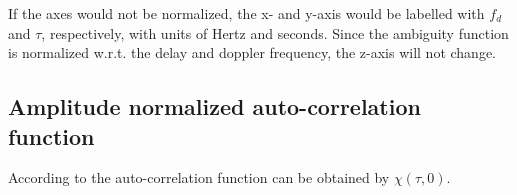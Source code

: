 If the axes would not be normalized, the x- and y-axis would be labelled with $f_d$ and $\tau$, respectively, with units of Hertz and seconds. Since the ambiguity function is normalized w.r.t. the delay and doppler frequency, the z-axis will not change. 

\subsection{Amplitude normalized auto-correlation function}
According to  the auto-correlation function can be obtained by $\chi(\tau,0)$. 


